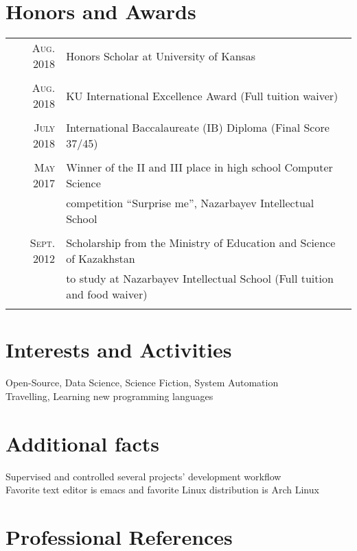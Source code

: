 \documentclass[a4paper,10pt]{article}
\begin{document}
\section{Honors and Awards}
\begin{tabular}{rl}
  
  \textsc{Aug.} 2018 & Honors Scholar at University of Kansas\\\\

  \textsc{Aug.} 2018 & KU International Excellence Award \footnotesize{(Full tuition waiver)}\\\\

  \textsc{July} 2018 & International Baccalaureate (IB) Diploma \footnotesize(Final Score 37/45)\\\\

  \textsc{May} 2017 & Winner of the II and III place in high school Computer Science \\&competition “Surprise me”, Nazarbayev Intellectual School\\\\

  \textsc{Sept.} 2012 & Scholarship from the Ministry of Education and Science of Kazakhstan\\&to study at Nazarbayev Intellectual School \footnotesize(Full tuition and food waiver)\normalsize\\\\

\end{tabular}

\section{Interests and Activities}
Open-Source, Data Science, Science Fiction, System Automation\\
Travelling, Learning new programming languages

\section{Additional facts}
Supervised and controlled several projects' development workflow\\
Favorite text editor is emacs and favorite Linux distribution is Arch Linux

\section{Professional References}
\end{document}
